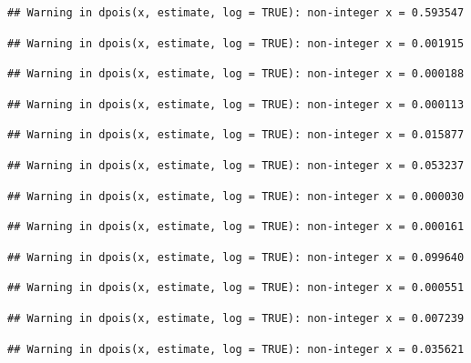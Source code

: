 \documentclass[]{article}
\begin{document}
\begin{verbatim}
## Warning in dpois(x, estimate, log = TRUE): non-integer x = 0.593547
\end{verbatim}

\begin{verbatim}
## Warning in dpois(x, estimate, log = TRUE): non-integer x = 0.001915
\end{verbatim}

\begin{verbatim}
## Warning in dpois(x, estimate, log = TRUE): non-integer x = 0.000188
\end{verbatim}

\begin{verbatim}
## Warning in dpois(x, estimate, log = TRUE): non-integer x = 0.000113
\end{verbatim}

\begin{verbatim}
## Warning in dpois(x, estimate, log = TRUE): non-integer x = 0.015877
\end{verbatim}

\begin{verbatim}
## Warning in dpois(x, estimate, log = TRUE): non-integer x = 0.053237
\end{verbatim}

\begin{verbatim}
## Warning in dpois(x, estimate, log = TRUE): non-integer x = 0.000030
\end{verbatim}

\begin{verbatim}
## Warning in dpois(x, estimate, log = TRUE): non-integer x = 0.000161
\end{verbatim}

\begin{verbatim}
## Warning in dpois(x, estimate, log = TRUE): non-integer x = 0.099640
\end{verbatim}

\begin{verbatim}
## Warning in dpois(x, estimate, log = TRUE): non-integer x = 0.000551
\end{verbatim}

\begin{verbatim}
## Warning in dpois(x, estimate, log = TRUE): non-integer x = 0.007239
\end{verbatim}

\begin{verbatim}
## Warning in dpois(x, estimate, log = TRUE): non-integer x = 0.035621
\end{verbatim}
\end{document}
